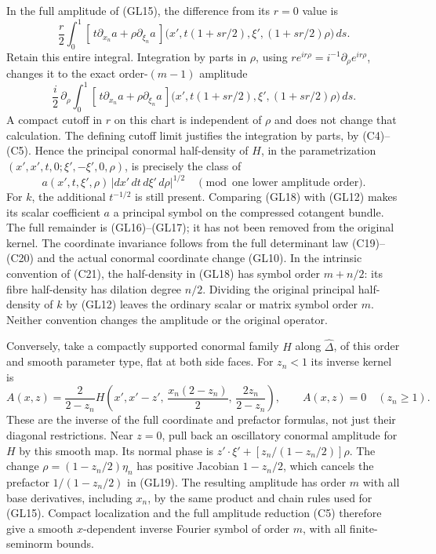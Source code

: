 \documentclass[
  11pt,
]{article}
\begin{document}
In the full amplitude of (GL15), the difference from its \(r=0\) value
is \[
 \frac r2\int_0^1
 [\,t\partial_{x_n}a+\rho\partial_{\xi_n}a\,]
 \bigl(x',t(1+s r/2),\xi',(1+s r/2)\rho\bigr)\,ds .
 \tag{GL16}
\] Retain this entire integral. Integration by parts in \(\rho\), using
\(r e^{ir\rho}=i^{-1}\partial_\rho e^{ir\rho}\), changes it to the exact
order-\((m-1)\) amplitude \[
 \frac i2\,\partial_\rho\int_0^1
 [\,t\partial_{x_n}a+\rho\partial_{\xi_n}a\,]
 \bigl(x',t(1+s r/2),\xi',(1+s r/2)\rho\bigr)\,ds .
 \tag{GL17}
\] A compact cutoff in \(r\) on this chart is independent of \(\rho\)
and does not change that calculation. The defining cutoff limit
justifies the integration by parts, by (C4)--(C5). Hence the principal
conormal half-density of \(H\), in the parametrization
\((x',x',t,0;\xi',-\xi',0,\rho)\), is precisely the class of \[
 a(x',t,\xi',\rho)\,|dx'\,dt\,d\xi'\,d\rho|^{1/2}
 \quad\pmod{\text{one lower amplitude order}} .
 \tag{GL18}
\] For \(k\), the additional \(t^{-1/2}\) is still present. Comparing
(GL18) with (GL12) makes its scalar coefficient \(a\) a principal symbol
on the compressed cotangent bundle. The full remainder is
(GL16)--(GL17); it has not been removed from the original kernel. The
coordinate invariance follows from the full determinant law (C19)--(C20)
and the actual conormal coordinate change (GL10). In the intrinsic
convention of (C21), the half-density in (GL18) has symbol order
\(m+n/2\): its fibre half-density has dilation degree \(n/2\). Dividing
the original principal half-density of \(k\) by (GL12) leaves the
ordinary scalar or matrix symbol order \(m\). Neither convention changes
the amplitude or the original operator.

Conversely, take a compactly supported conormal family \(H\) along
\(\widehat\Delta\), of this order and smooth parameter type, flat at
both side faces. For \(z_n<1\) its inverse kernel is \[
 A(x,z)=\frac{2}{2-z_n}
 H\left(x',x'-z',\,\frac{x_n(2-z_n)}2,\,
                         \frac{2z_n}{2-z_n}\right),\qquad
 A(x,z)=0\quad(z_n\ge1).
 \tag{GL19}
\] These are the inverse of the full coordinate and prefactor formulas,
not just their diagonal restrictions. Near \(z=0\), pull back an
oscillatory conormal amplitude for \(H\) by this smooth map. Its normal
phase is \(z'\cdot\xi'+[z_n/(1-z_n/2)]\rho\). The change
\(\rho=(1-z_n/2)\eta_n\) has positive Jacobian \(1-z_n/2\), which
cancels the prefactor \(1/(1-z_n/2)\) in (GL19). The resulting amplitude
has order \(m\) with all base derivatives, including \(x_n\), by the
same product and chain rules used for (GL15). Compact localization and
the full amplitude reduction (C5) therefore give a smooth
\(x\)-dependent inverse Fourier symbol of order \(m\), with all
finite-seminorm bounds.
\end{document}
